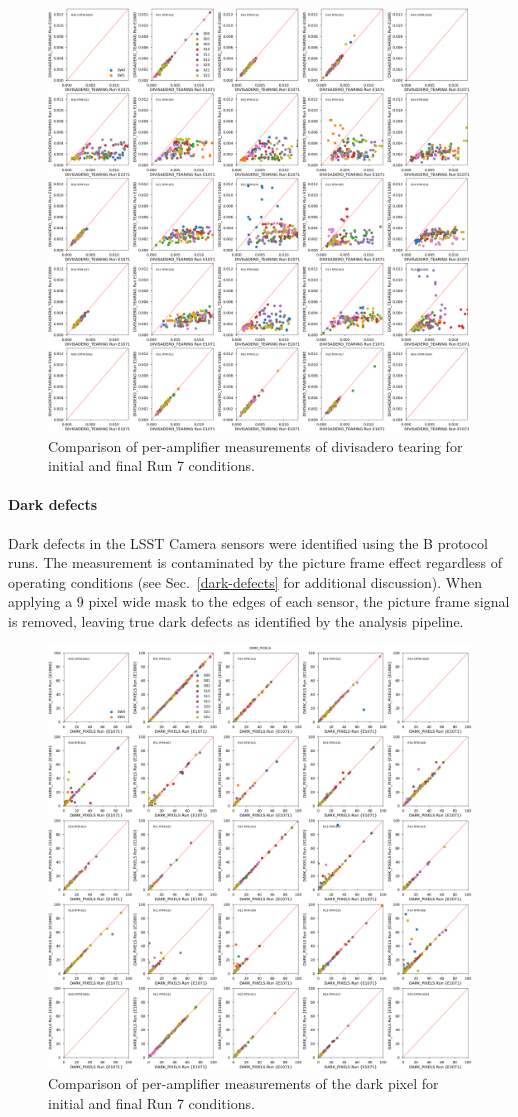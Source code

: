 \begin{figure}[ht]
    \centering
    \includegraphics[width=0.7\linewidth]{figures/finalCharacterization/E1071_E1880_DIVISADERO_TEARING.png}
    \caption{Comparison of per-amplifier measurements of divisadero tearing for initial and final Run 7 conditions.}
    \label{fig:finalChar-Divisadero-5x5}
\end{figure}


\clearpage
\paragraph{Dark defects}\label{final-dark-defects}

Dark defects in the LSST Camera sensors were identified using the B protocol runs.  The measurement is contaminated by the picture frame effect regardless of operating conditions (see Sec.~\ref{dark-defects} for additional discussion). When applying a 9 pixel wide mask to the edges of each sensor, the picture frame signal is removed, leaving true dark defects as identified by the analysis pipeline.

\begin{figure}[ht]
    \centering
    \includegraphics[width=0.7\linewidth]{figures/finalCharacterization/E1880_E1071_DARK_PIXELS_inset.png}
    \caption{Comparison of per-amplifier measurements of the dark pixel for initial and final Run 7 conditions.}
    \label{fig:finalChar-DarkPix-5x5}
\end{figure}


